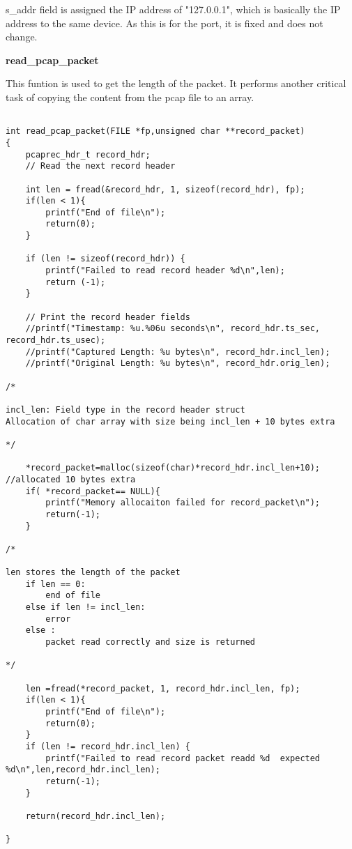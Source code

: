 \documentclass[12pt, a4paper]{report}
\begin{document}
s\_addr field is assigned the IP address of "127.0.0.1", which is basically the IP address to the same device. As this is for the port, it is fixed and does not change.

\newpage

\textbf{read\_pcap\_packet}

This funtion is used to get the length of the packet. It performs another critical task of copying the content from the pcap file to an array.


\begin{lstlisting}[caption={Finding the length of the packet}]

int read_pcap_packet(FILE *fp,unsigned char **record_packet)
{
    pcaprec_hdr_t record_hdr;
    // Read the next record header

    int len = fread(&record_hdr, 1, sizeof(record_hdr), fp);
    if(len < 1){
        printf("End of file\n");
        return(0);
    } 
    
    if (len != sizeof(record_hdr)) {
        printf("Failed to read record header %d\n",len);
        return (-1);
    }

    // Print the record header fields
    //printf("Timestamp: %u.%06u seconds\n", record_hdr.ts_sec, record_hdr.ts_usec);
    //printf("Captured Length: %u bytes\n", record_hdr.incl_len);
    //printf("Original Length: %u bytes\n", record_hdr.orig_len);

/*

incl_len: Field type in the record header struct
Allocation of char array with size being incl_len + 10 bytes extra

*/

    *record_packet=malloc(sizeof(char)*record_hdr.incl_len+10); //allocated 10 bytes extra
    if( *record_packet== NULL){
        printf("Memory allocaiton failed for record_packet\n");
        return(-1);
    }

/*

len stores the length of the packet
    if len == 0:
        end of file
    else if len != incl_len:
        error
    else :
        packet read correctly and size is returned

*/
    
    len =fread(*record_packet, 1, record_hdr.incl_len, fp);
    if(len < 1){
        printf("End of file\n");
        return(0);
    }  
    if (len != record_hdr.incl_len) {
        printf("Failed to read record packet readd %d  expected %d\n",len,record_hdr.incl_len);
        return(-1);
    } 

    return(record_hdr.incl_len);

}

\end{lstlisting}
\end{document}
